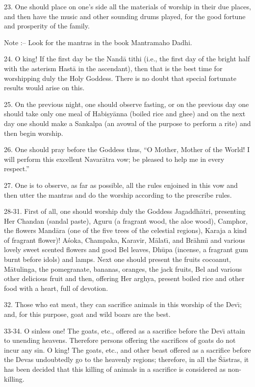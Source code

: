 23. One should place on one's side all the materials of worship in their due places, and then have the music and other sounding drums played, for the good fortune and prosperity of the family.

Note :-- Look for the mantras in the book Mantramaho Dadhi.

24. O king! If the first day be the Nand\=a tithi (i.e., the first day of the bright half with the asterism Hast\=a in the ascendant), then that is the best time for worshipping duly the Holy Goddess. There is no doubt that special fortunate results would arise on this.

25. On the previous night, one should observe fasting, or on the previous day one should take only one meal of Habi\d{s}y\=anna (boiled rice and ghee) and on the next day one should make a Sankalpa (an avowal of the purpose to perform a rite) and then begin worship.

26. One should pray before the Goddess thus, ``O Mother, Mother of the World! I will perform this excellent Navar\=atra vow; be pleased to help me in every respect.''

27. One is to observe, as far as possible, all the rules enjoined in this vow and then utter the mantras and do the worship according to the prescribe rules.

28-31. First of all, one should worship duly the Goddess Jagaddh\=atri, presenting Her Chandan (sandal paste), Aguru (a fragrant wood, the aloe wood), Camphor, the flowers Mand\=ara (one of the five trees of the celestial regions), Karaja a kind of fragrant flower)! A\'soka, Champaka, Karavir, M\=alat\={\i}, and Br\=ahm\={\i} and various lovely sweet scented flowers and good Bel leaves, Dh\=upa (incense, a fragrant gum burnt before idols) and lamps. Next one should present the fruits cocoanut, M\=atulinga, the pomegranate, bananas, oranges, the jack fruits, Bel and various other delicious fruit and then, offering Her arghya, present boiled rice and other food with a heart, full of devotion.

32. Those who eat meat, they can sacrifice animals in this worship of the Dev\={\i}; and, for this purpose, goat and wild boars are the best.

33-34. O sinless one! The goats, etc., offered as a sacrifice before the Dev\={\i} attain to unending heavens. Therefore persons offering the sacrifices of goats do not incur any sin. O king! The goats, etc., and other beast offered as a sacrifice before the Devas undoubtedly go to the heavenly regions; therefore, in all the \'S\=astras, it has been decided that this killing of animals in a sacrifice is considered as non-killing.


